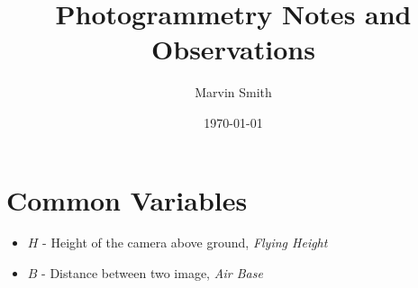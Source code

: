\documentclass[10pt]{report}
\title{Photogrammetry Notes and Observations}
\author{Marvin Smith}
\date{\today}
\begin{document}
\maketitle

\tableofcontents
\clearpage



\chapter*{Common Variables}

\begin{itemize}
\item $H$ - Height of the camera above ground, \emph{Flying Height}
\item $B$ - Distance between two image, \emph{Air Base}
\end{itemize}








\glsaddall
\printglossary




\nocite{*}

\printindex
\end{document}

